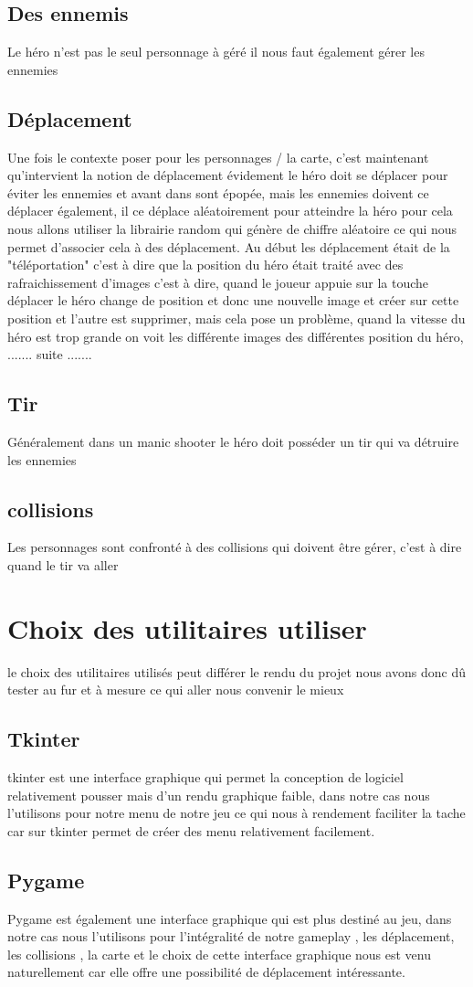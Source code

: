 \documentclass[a4paper, 11pt]{article}
\begin{document}
	\subsection{Des ennemis}
Le héro n'est pas le seul personnage à géré il nous faut également gérer les ennemies
	\subsection{Déplacement}
Une fois le contexte poser pour les personnages / la carte, c'est maintenant qu'intervient la notion de déplacement évidement le héro doit se déplacer pour éviter les ennemies et avant dans sont épopée, mais les ennemies doivent ce déplacer également, il ce déplace aléatoirement pour atteindre la héro pour cela nous allons utiliser la librairie random qui génère de chiffre aléatoire ce qui nous permet d'associer cela à des déplacement.
Au début les déplacement était de la "téléportation" c'est à dire que la position du héro était traité avec des rafraichissement d'images c'est à dire, quand le joueur appuie sur la touche déplacer le héro change de position et donc une nouvelle image et créer sur cette position et l'autre est supprimer, mais cela pose un problème, quand la vitesse du héro est trop grande on voit les différente images des différentes position du héro, ....... suite .......
	
	\subsection{Tir}
Généralement dans un manic shooter le héro doit posséder un tir qui va détruire les ennemies 
	\subsection{collisions}
Les personnages sont confronté à des collisions qui doivent être gérer, c'est à dire quand le tir va aller
\section{Choix des utilitaires utiliser}

le choix des utilitaires utilisés peut différer le rendu du projet nous avons donc dû tester au fur et à mesure ce qui aller nous convenir le mieux

\subsection{Tkinter}
tkinter est une interface graphique qui permet la conception de logiciel relativement pousser mais d'un rendu graphique faible, dans notre cas nous l'utilisons pour notre menu de notre jeu ce qui nous à rendement faciliter la tache car sur tkinter permet de créer des menu relativement facilement.
\subsection{Pygame}
Pygame est également une interface graphique qui est plus destiné au jeu,
dans notre cas nous l'utilisons pour l'intégralité de notre gameplay , les déplacement, les collisions , la carte et le choix de cette interface graphique nous est venu naturellement car elle offre une possibilité de déplacement intéressante.
\end{document}
